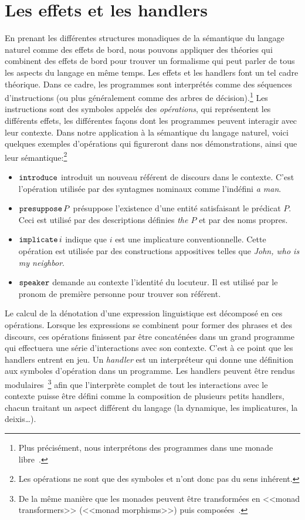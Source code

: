 \section*{Les effets et les handlers}

En prenant les différentes structures monadiques de la sémantique du langage
naturel comme des effets de bord, nous pouvons appliquer des théories qui
combinent des effets de bord pour trouver un formalisme qui peut parler de tous
les aspects du langage en même temps. Les effets et les handlers font un tel
cadre théorique. Dans ce cadre, les programmes sont interprétés comme des
séquences d'instructions (ou plus généralement comme des arbres de
décision).\footnote{Plus précisément, nous interprétons des programmes dans une
  monade libre~\cite{swierstra2008data}.} Les instructions sont des symboles
appelés des \emph{opérations}, qui représentent les différents effets, les
différentes façons dont les programmes peuvent interagir avec leur contexte.
Dans notre application à la sémantique du langage naturel, voici quelques
exemples d'opérations qui figureront dans nos démonstrations, ainsi que leur
sémantique:\footnote{Les opérations ne sont que des symboles et n'ont donc pas
  du sens inhérent.}

\begin{itemize}
\item $\mathtt{introduce}$ introduit un nouveau référent de discours dans le
  contexte. C'est l'opération utilisée par des syntagmes nominaux comme
  l'indéfini \emph{a man}.
\item $\mathtt{presuppose}\,P$ présuppose l'existence d'une entité satisfaisant
  le prédicat $P$. Ceci est utilisé par des descriptions définies \emph{the $P$}
  et par des noms propres.
\item $\mathtt{implicate}\,i$ indique que $i$ est une implicature
  conventionnelle. Cette opération est utilisée par des constructions
  appositives telles que \emph {John, who is my neighbor}.
\item $\mathtt{speaker}$ demande au contexte l'identité du locuteur. Il est utilisé
  par le pronom de première personne pour trouver son référent.
\end{itemize}

Le calcul de la dénotation d'une expression linguistique est décomposé en ces
opérations. Lorsque les expressions se combinent pour former des phrases et des
discours, ces opérations finissent par être concaténées dans un grand programme
qui effectuera une série d'interactions avec son contexte. C'est à ce point que
les handlers entrent en jeu. Un \emph{handler} est un interpréteur qui donne une
définition aux symboles d'opération dans un programme. Les handlers peuvent être
rendus modulaires~\footnote{De la même manière que les monades peuvent être
  transformées en <<monad transformers>> (<<monad morphisms>>) puis
  composées~\cite{shan2002monads,wu2015transformers}.} afin que l'interprète
complet de tout les interactions avec le contexte puisse être défini comme la
composition de plusieurs petits handlers, chacun traitant un aspect différent du
langage (la dynamique, les implicatures, la deixis\ldots).


